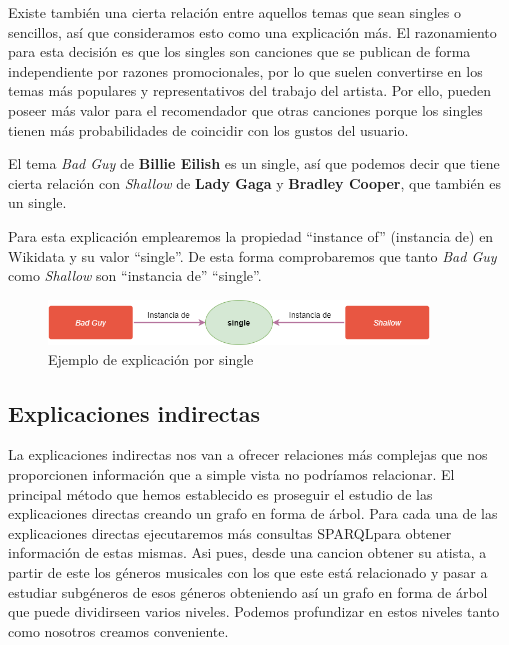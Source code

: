 Existe también una cierta relación entre aquellos temas que sean singles o sencillos, así que consideramos esto como una explicación más. El razonamiento para esta decisión es que los singles son canciones que se publican de forma independiente por razones promocionales, por lo que suelen convertirse en los temas más populares y representativos del trabajo del artista. Por ello, pueden poseer más valor para el recomendador que otras canciones porque los singles tienen más probabilidades de coincidir con los gustos del usuario.

El tema \textit{Bad Guy} de \textbf{Billie Eilish} es un single, así que podemos decir que tiene cierta relación con \textit{Shallow} de \textbf{Lady Gaga} y \textbf{Bradley Cooper}, que también es un single.

Para esta explicación emplearemos la propiedad ``instance of'' (instancia de) en Wikidata y su valor ``single''. De esta forma comprobaremos que tanto \textit{Bad Guy} como \textit{Shallow} son ``instancia de'' ``single''.\\

\begin{figure}[h!]
	\centering
	\includegraphics[width = 0.9\textwidth]{Imagenes/Bitmap/Single ejemplo.png}
	\caption{Ejemplo de explicación por single}
	\label{fig:sampleImage}
\end{figure}

\subsection{Explicaciones indirectas}

La explicaciones indirectas nos van a ofrecer relaciones más complejas que nos proporcionen información que a simple vista no podríamos relacionar.
El principal método que hemos establecido es proseguir el estudio de las explicaciones directas creando un grafo en forma de árbol.
Para cada una de las explicaciones directas ejecutaremos más consultas SPARQLpara obtener información de estas mismas. Asi pues, desde una cancion obtener su atista, a partir de este los géneros musicales con los que este está relacionado y pasar a estudiar subgéneros de esos géneros obteniendo así un grafo en forma de árbol que puede dividirseen varios niveles. Podemos profundizar en estos niveles tanto como nosotros creamos conveniente. \\


